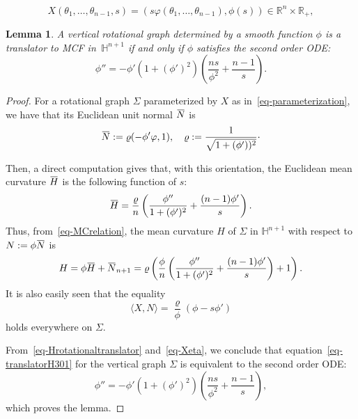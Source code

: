 \documentclass[10pt,a4paper]{amsart}
\newtheorem{lemma}{Lemma}
\newcommand{\R}{\mathbb{R} }
\renewcommand{\Sigma}{\varSigma}
\newcommand{\h}{\mathbb{H} }
\newcommand{\overbar}[1]{\mkern 1.5mu\overline{\mkern-1.5mu#1\mkern-1.5mu}\mkern 1.5mu}
\renewcommand{\rho}{\varrho}
\begin{document}
\begin{equation} \label{eq-parameterization}
X(\theta_1,\dots, \theta_{n-1},s)=
(s\varphi(\theta_1,\dots,\theta_{n-1}),\phi(s))\in\R^{n}\times\R_+,
\end{equation}

\begin{lemma} \label{lem-rotationalODE01}
A vertical rotational graph determined by a smooth function $\phi$ is
a translator to {\rm MCF} in \,$\h^{n+1}$
if and only if $\phi$ satisfies the second order {\rm ODE}:
\begin{equation} \label{eq-EDOPsi}
\phi''=-\phi'(1+(\phi')^2)\left(\frac{ns}{\phi^2}+\frac{n-1}s\right).
\end{equation}
\end{lemma}

\begin{proof}
For a rotational graph $\Sigma$ parameterized by
$X$ as in~\eqref{eq-parameterization}, we have that its
Euclidean unit normal $\overbar N$ is
\[
\overbar N:=\rho(-\phi'\varphi,1),
\quad \rho:=\frac{1}{\sqrt{1+(\phi'))^2}}\cdot
\]

Then, a direct computation gives that, with this orientation,
the Euclidean mean curvature $\overbar H$ is the following function of $s$:
\[
\overbar H=\frac{\rho}{n}\left(\frac{\phi''}{1+(\phi')^2}+\frac{(n-1)\phi'}{s}\right).
\]
Thus, from~\eqref{eq-MCrelation}, the mean curvature $H$ of $\Sigma$ in $\h^{n+1}$ with respect to $N:=\phi\overbar N$ is
\begin{equation} \label{eq-Hrotationaltranslator}
H=\phi\overbar H+\overbar N_{n+1}
=\rho\left(
\frac{\phi}{n}\left(\frac{\phi''}{1+(\phi')^2}+\frac{(n-1)\phi'}{s}\right)+1\right).
\end{equation}
It is also easily seen that the equality
\begin{equation} \label{eq-Xeta}
\langle X,N\rangle=\frac{\rho}{\phi}(\phi-s\phi')
\end{equation}
holds everywhere on $\Sigma.$


From~\eqref{eq-Hrotationaltranslator} and~\eqref{eq-Xeta}, we conclude that
equation~\eqref{eq-translatorH301} for the vertical graph
$\Sigma$ is equivalent to the second order ODE:
\begin{equation*}
\phi''=-\phi'(1+(\phi')^2)\left(\frac{ns}{\phi^2}+\frac{n-1}s\right),
\end{equation*}
which proves the lemma.
\end{proof}
\end{document}
